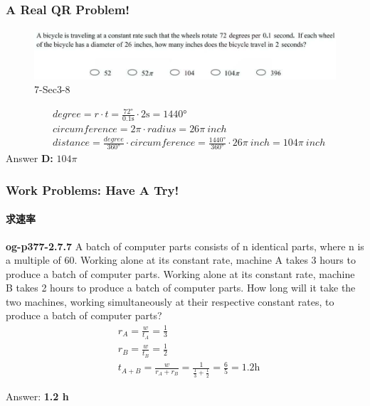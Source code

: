 \documentclass[
	11pt, %
	handout,
]{beamer}
\begin{document}

\begin{frame}
	\frametitle{A Real QR Problem!}
	\framesubtitle{}
	\begin{figure}
		\includegraphics[width=\linewidth]{Rate_Example_Question1.png}
		\caption{7-Sec3-8}
	\end{figure}
	\pause
	\begin{equation*}
	  \begin{aligned}
	  		&degree =  r \cdot t = \frac{\ang{72}}{0.1 \unit{\second}} \cdot 2 \unit{\second} = \ang{1440}\\
		    &circumference = 2 \pi \cdot radius  = 26 \pi \ \unit{inch}\\
		    & distance = \frac{degree}{\ang{360}} \cdot circumference = \frac{\ang{1440}}{\ang{360}} \cdot 26 \pi \ \unit{inch}= 104 \pi \ \unit{inch}
	  \end{aligned}
	\end{equation*}
	\pause
	\bigskip
	Answer \textbf{D: } $104\pi$
\end{frame}


\begin{frame}
	\frametitle{Work Problems: Have A Try!}
	\framesubtitle{求速率}
	\textbf{og-p377-2.7.7}
	A batch of computer parts consists of n identical parts,
where n is a multiple of 60. Working alone at its constant rate, machine A
takes 3 hours to produce a batch of computer parts. Working alone at its
constant rate, machine B takes 2 hours to produce a batch of computer
parts. How long will it take the two machines, working simultaneously at
their respective constant rates, to produce a batch of computer parts?\\
	\pause
	\bigskip
	\begin{equation*}
	  \begin{aligned}
	  		&r_A = \frac{w}{t_A}= \frac{1}{3} \\
	  		&r_B = \frac{w}{t_B}= \frac{1}{2} \\
		    &t_{A+B} = \frac{w}{r_A + r_B} = \frac{1}{\frac{1}{3}  + \frac{1}{2}} = \frac{6}{5} = 1.2 \unit{\hour}
	  \end{aligned}
	\end{equation*}


	\pause
	\bigskip
	Answer: \textbf{1.2 \unit{\hour}}
\end{frame}
\end{document}
